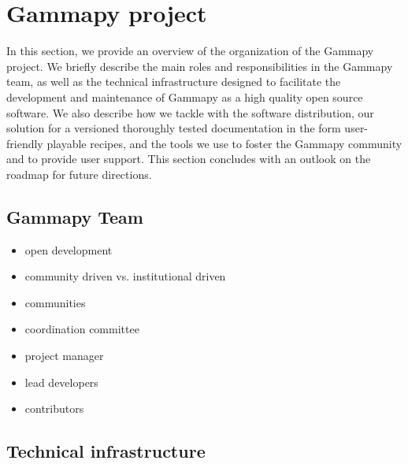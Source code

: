 \section{Gammapy project}
\label{sec:gammapy-project}


In this section, we provide an overview of the organization of the Gammapy project. We briefly describe the main roles and responsibilities in the Gammapy team, as well as the technical infrastructure designed to facilitate the development and maintenance of Gammapy as a high quality open source software. We also describe how we tackle with the software distribution, our solution for a versioned thoroughly tested documentation in the form user-friendly playable recipes, and the tools we use to foster the Gammapy community and to provide user support. This section concludes with an outlook on the roadmap for future directions.

\subsection{Gammapy Team}
\label{ssec:gammapy-team}

\begin{itemize}
	\item open development
	\item community driven vs. institutional driven
	\item communities
\end{itemize}

\begin{itemize}
	\item coordination committee
	\item project manager
	\item lead developers
	\item contributors
\end{itemize}

\subsection{Technical infrastructure}
\label{ssec:technical-infrastructure}

